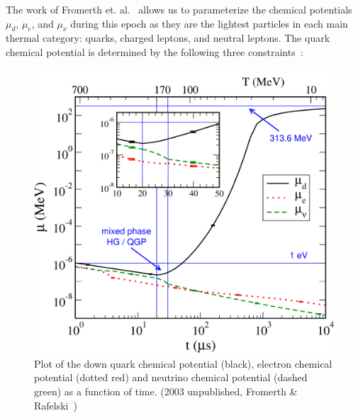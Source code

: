 \documentclass[universe,article,submit,moreauthors,pdftex,a4paper]{Definitions/mdpi}
\begin{document}
The work of Fromerth et. al.~\cite{Fromerth:2012fe} allows us to parameterize the chemical potentials $\mu_d$, $\mu_e$, and $\mu_\nu$ during this epoch as they are the lightest particles in each main thermal category: quarks, charged leptons, and neutral leptons. The quark chemical potential is determined by the following three constraints~\cite{Fromerth:2012fe}:
\begin{figure}[ht]
 \centering
 \includegraphics[width=\textwidth]{./plots/mu_combo.pdf}
 \caption{Plot of the down quark chemical potential (black), electron chemical potential (dotted red) and neutrino chemical potential (dashed green) as a function of time. (2003 unpublished, Fromerth \& Rafelski~\cite{Rafelski:2019twp})}
 \label{QGPchem1} 
\end{figure}
\end{document}
